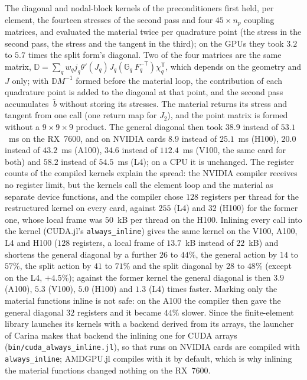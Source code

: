 \documentclass{article}
\newcommand{\F}{~F}
\newcommand{\code}[1]{\texttt{#1}}
\theoremstyle{definition}
\theoremstyle{plain}
\begin{document}
The diagonal and nodal-block kernels of the preconditioners first held, per
element, the fourteen stresses of the second pass and four $45\times n_p$
coupling matrices, and evaluated the material twice per quadrature point
(the stress in the second pass, the stress and the tangent in the third);
on the GPUs they took $3.2$ to $5.7$ times the split form's diagonal. Two of
the four matrices are the same matrix, $\mathbb{D} = \sum_q w_q j_q
\theta'(J_q) J_q (\mathbb{G}_q \F_q^{-\mathsf T}) \chi_q^{\mathsf T}$, which
depends on the geometry and $J$ only; with $\mathbb{D} M^{-1}$ formed before
the material loop, the contribution of each quadrature point is added to the
diagonal at that point, and the second pass accumulates $\bar{~b}$ without
storing its stresses. The material returns its stress and tangent from one
call (one return map for $J_2$), and the point matrix is formed without a
$9\times9\times9$ product. The general diagonal then took $38.9$ instead of
$53.1$~ms on the RX~7600, and on NVIDIA cards $8.9$ instead of $25.1$~ms
(H100), $20.0$ instead of $43.2$~ms (A100), $34.6$ instead of $112.4$~ms
(V100, the same card for both) and $58.2$ instead of $54.5$~ms (L4); on a
CPU it is unchanged. The register counts of the compiled kernels explain the
spread: the NVIDIA compiler receives no register limit, but the kernels call
the element loop and the material as separate device functions, and the
compiler chose $128$ registers per thread for the restructured kernel on
every card, against $255$ (L4) and $32$ (H100) for the former one, whose
local frame was $50$~kB per thread on the H100. Inlining every call into the
kernel (CUDA.jl's \code{always\_inline}) gives the same kernel on the V100,
A100, L4 and H100 ($128$ registers, a local frame of $13.7$~kB instead of
$22$~kB) and shortens the general diagonal by a further $26$ to $44\%$, the
general action by $14$ to $57\%$, the split action by $41$ to $71\%$ and the
split diagonal by $28$ to $48\%$ (except on the L4, $+4.5\%$); against the
former kernel the general diagonal is then $3.9$ (A100), $5.3$ (V100),
$5.0$ (H100) and $1.3$ (L4) times faster. Marking only the material
functions inline is not safe: on the A100 the compiler then gave the general
diagonal $32$ registers and it became $44\%$ slower. Since the
finite-element library launches its kernels with a backend derived from its
arrays, the launcher of Carina makes that backend the inlining one for CUDA
arrays (\code{bin/cuda\_always\_inline.jl}), so that runs on NVIDIA cards are
compiled with \code{always\_inline}; AMDGPU.jl compiles with it by default,
which is why inlining the material functions changed nothing on the
RX~7600.
\end{document}
